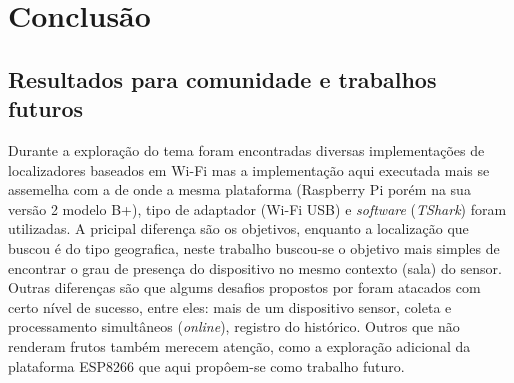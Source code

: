 \chapter{Conclusão}
\label{chap:Conclusao}


\section{Resultados para comunidade e trabalhos futuros}
\label{sec:trab-futuros}

Durante a exploração do tema foram encontradas diversas implementações de
localizadores baseados em Wi-Fi mas a implementação aqui executada mais se
assemelha com a de  onde a mesma plataforma
(Raspberry Pi porém na sua versão 2 modelo B+), tipo de adaptador (Wi-Fi USB)
e \emph{software} (\emph{TShark}) foram utilizadas. A pricipal diferença são os
objetivos, enquanto a localização que  buscou é do tipo
geografica, neste trabalho buscou-se o objetivo mais simples de encontrar o grau
de presença do dispositivo no mesmo contexto (sala) do sensor. Outras diferenças
são que algums desafios propostos por  foram atacados
com certo nível de sucesso, entre eles: mais de um dispositivo sensor,
coleta e processamento simultâneos (\emph{online}), registro do histórico.
Outros que não renderam frutos também merecem atenção, como a exploração
adicional da plataforma ESP8266 que aqui propôem-se como trabalho futuro.
